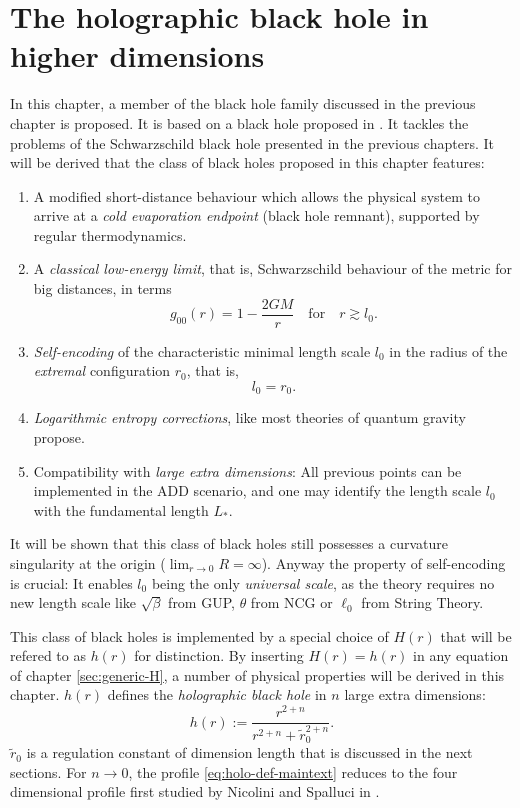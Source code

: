 \documentclass[12pt,a4paper]{report}
\numberwithin{equation}{chapter}
\begin{document}
\chapter{The holographic black hole in higher dimensions} \label{sec:holo}
In this chapter, a member of the black hole family discussed in the previous chapter is proposed. It is based on a black hole proposed in \cite{NS2013}. It tackles the problems of the Schwarzschild black hole presented in the previous chapters. It will be derived that the class of black holes proposed in this chapter features:
\begin{enumerate}
\item A modified short-distance behaviour which allows the physical system to arrive at a \emph{cold evaporation endpoint} (black hole remnant), supported by regular thermodynamics.
%
\item A \emph{classical low-energy limit}, that is, Schwarzschild behaviour of the metric for big distances, in terms
\begin{equation}
g_{00}(r) = 1 - \frac{2GM}{r} \quad \text{for} \quad r \gtrsim l_0.
\end{equation}
%
\item \emph{Self-encoding} of the characteristic minimal length scale $l_0$ in the radius of the \emph{extremal} configuration $r_0$, that is,
\begin{equation}\label{eq:self-encoding-principle}
l_0 = r_0.
\end{equation}
%
\item \emph{Logarithmic entropy corrections}, like most theories of quantum gravity propose.
%
\item Compatibility with \emph{large extra dimensions}: All previous points can be implemented in the ADD scenario, and one may identify the length scale $l_0$ with the fundamental length $L_*$.
\end{enumerate}
It will be shown that this class of black holes still possesses a curvature singularity at the origin ($\lim_{r\to 0} R = \infty$). Anyway the property of self-encoding is crucial: It enables $l_0$ being the only \emph{universal scale}, as the theory requires no new length scale like $\sqrt{\beta}$ from GUP, $\theta$ from NCG or $\ell_0$ from String Theory.

This class of black holes is implemented by a special choice of $H(r)$ that will be refered to as $h(r)$ for distinction. By inserting $H(r)=h(r)$ in any equation of chapter \ref{sec:generic-H}, a number of physical properties will be derived in this chapter. $h(r)$ defines the \emph{holographic black hole} in $n$ large extra dimensions:
\begin{equation}\label{eq:holo-def-maintext}
h(r) := \frac{r^{2+n}}{r^{2+n} + \tilde r^{2+n}_0}.
\end{equation}
$\tilde r_0$ is a regulation constant of dimension length that is discussed in the next sections. For $n\to 0$, the profile \eqref{eq:holo-def-maintext} reduces to the four dimensional profile first studied by Nicolini and Spalluci in \cite{NS2013}.
\end{document}
